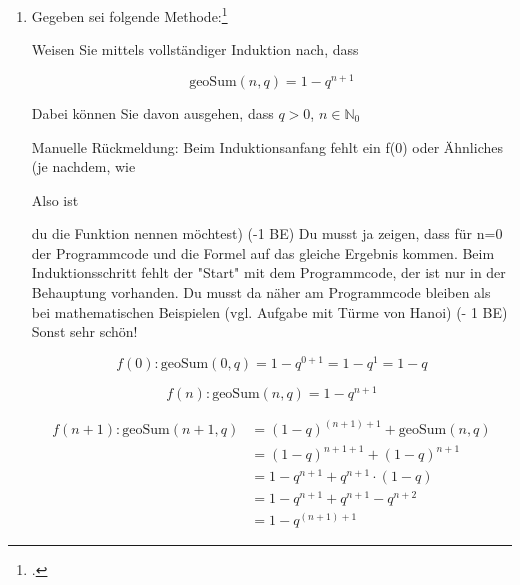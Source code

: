\documentclass{lehramt-informatik-aufgabe}
\begin{document}
\begin{enumerate}
\item Gegeben sei folgende Methode:\footcite{sosy:e-klausur}


Weisen Sie mittels vollständiger Induktion nach, dass

\begin{displaymath}
\text{geoSum}(n,q) = 1 - q^{n+1}
\end{displaymath}

Dabei können Sie davon ausgehen, dass $q > 0$, $ n \in \mathbb{N}_0$

Manuelle Rückmeldung:
Beim Induktionsanfang fehlt ein f(0) oder Ähnliches (je nachdem, wie

Also ist

du die Funktion nennen möchtest) (-1 BE) Du musst ja zeigen, dass für
n=0 der Programmcode und die Formel auf das gleiche Ergebnis kommen.
Beim Induktionsschritt fehlt der "Start" mit dem Programmcode, der ist
nur in der Behauptung vorhanden. Du musst da näher am Programmcode
bleiben als bei mathematischen Beispielen (vgl. Aufgabe mit Türme von
Hanoi) (- 1 BE) Sonst sehr schön!

\begin{liAntwort}

\begin{displaymath}
f(0): \text{geoSum}(0, q) = 1 - q^{0+1} = 1 - q^1 = 1 - q
\end{displaymath}


\begin{displaymath}
f(n): \text{geoSum}(n, q) = 1 - q^{n+1}
\end{displaymath}


\begin{align*}
f(n+1): \text{geoSum}(n + 1, q)
& = (1 - q)^{(n + 1) + 1} + \text{geoSum}(n, q) \\
& = (1 - q)^{n + 1 + 1} + (1 - q)^{n + 1} \\
& = 1-q^{n+1} + q^{n+1} \cdot (1-q) \\
& = 1-q^{n+1}+q^{n+1}-q^{n+2} \\
& = 1-q^{(n+1)+1}
\end{align*}

\end{liAntwort}


\end{enumerate}
\end{document}
